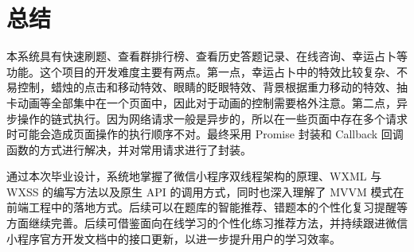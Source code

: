 \section{总结}

本系统具有快速刷题、查看群排行榜、查看历史答题记录、在线咨询、幸运占卜等功能。这个项目的开发难度主要有两点。第一点，幸运占卜中的特效比较复杂、不易控制，蜡烛的点击和移动特效、眼睛的眨眼特效、背景根据重力移动的特效、抽卡动画等全部集中在一个页面中，因此对于动画的控制需要格外注意。第二点，异步操作的链式执行。因为网络请求一般是异步的，所以在一些页面中存在多个请求时可能会造成页面操作的执行顺序不对。最终采用 Promise 封装和 Callback 回调函数的方式进行解决，并对常用请求进行了封装。

通过本次毕业设计，系统地掌握了微信小程序双线程架构的原理、WXML 与 WXSS 的编写方法以及原生 API 的调用方式，同时也深入理解了 MVVM 模式在前端工程中的落地方式。后续可以在题库的智能推荐、错题本的个性化复习提醒等方面继续完善\cite{bib:wang2021}。后续可借鉴面向在线学习的个性化练习推荐方法\cite{bib:zhang2020}，并持续跟进微信小程序官方开发文档\cite{bib:wechatdoc}中的接口更新，以进一步提升用户的学习效率。
